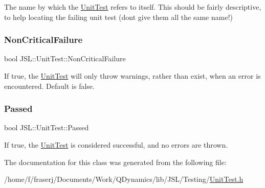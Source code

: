 The name by which the \hyperlink{classJSL_1_1UnitTest}{Unit\+Test} refers to itself. This should be fairly descriptive, to help locating the failing unit test (don\textquotesingle{}t give them all the same name!) 

\mbox{\label{classJSL_1_1UnitTest_a54dc4908d757c7f523be12a4275e595c}} 
\subsubsection{\texorpdfstring{Non\+Critical\+Failure}{NonCriticalFailure}}
{\footnotesize\ttfamily bool J\+S\+L\+::\+Unit\+Test\+::\+Non\+Critical\+Failure}



If true, the \hyperlink{classJSL_1_1UnitTest}{Unit\+Test} will only throw warnings, rather than exist, when an error is encountered. Default is false. 

\mbox{\label{classJSL_1_1UnitTest_afac1f363a8406fad39316ee772a837a9}} 
\subsubsection{\texorpdfstring{Passed}{Passed}}
{\footnotesize\ttfamily bool J\+S\+L\+::\+Unit\+Test\+::\+Passed}



If true, the \hyperlink{classJSL_1_1UnitTest}{Unit\+Test} is considered successful, and no errors are thrown. 



The documentation for this class was generated from the following file\+:\begin{DoxyCompactItemize}
\item 
/home/f/fraserj/\+Documents/\+Work/\+Q\+Dynamics/lib/\+J\+S\+L/\+Testing/\hyperlink{UnitTest_8h}{Unit\+Test.\+h}\end{DoxyCompactItemize}
